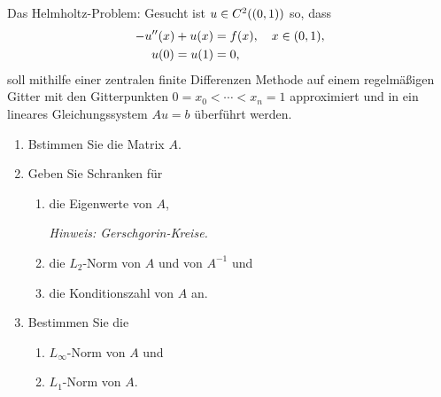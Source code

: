 \documentclass{exercise}
\begin{document}
    \begin{problem}
        Das Helmholtz-Problem: Gesucht ist \(u \in C^2\parentheses*{\parentheses*{0, 1}}\) so, dass
        \begin{align*}
            -u''\parentheses*{x} + u\parentheses*{x} &= f\parentheses*{x}, \quad x \in \parentheses*{0, 1},\\
            u\parentheses*{0} = u\parentheses*{1} &= 0,
        \end{align*}
        soll mithilfe einer zentralen finite Differenzen Methode auf einem regelmäßigen Gitter mit den Gitterpunkten \(0 = x_0 < \cdots < x_n = 1\) approximiert und in ein lineares Gleichungssystem \(Au = b\) überführt werden.
        \begin{enumerate}
            \item Bstimmen Sie die Matrix \(A\).
            \item Geben Sie Schranken für
            \begin{enumerate}
                \item die Eigenwerte von \(A\),

                \emph{Hinweis: Gerschgorin-Kreise.}
                \item die \(L_2\)-Norm von \(A\) und von \(A^{-1}\) und
                \item die Konditionszahl von \(A\) an.
            \end{enumerate}
            \item Bestimmen Sie die
            \begin{enumerate}
                \item \(L_\infty\)-Norm von \(A\) und
                \item \(L_1\)-Norm von \(A\).
            \end{enumerate}
        \end{enumerate}
    \end{problem}
    
\end{document}
